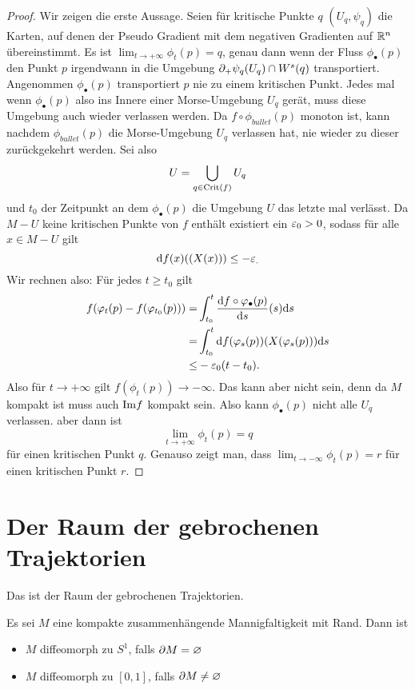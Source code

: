 \begin{proof}
    Wir zeigen die erste Aussage. Seien für kritische Punkte $q$ $(U_q, \psi_q)$ die Karten, 
    auf denen der Pseudo Gradient mit dem negativen Gradienten auf ${ \mathbb R }^n$ übereinstimmt. 
    Es ist $\lim_{t \to + \infty} \phi_t(p) = q$, genau dann wenn
    der Fluss $\phi_{\bullet}(p)$ den Punkt $p$ irgendwann in die Umgebung 
    ${ \partial }_+\psi_q(U_q) \cap { W^s }(q)$ transportiert. Angenommen $\phi_{\bullet}(p)$ transportiert
    $p$ nie zu einem kritischen Punkt. Jedes mal wenn $\phi_{\bullet}(p)$ also ins Innere einer
    Morse-Umgebung $U_q$ gerät, muss diese Umgebung auch wieder verlassen werden. Da 
    $f \circ \phi_{bullet}(p)$ monoton ist, kann nachdem $\phi_{bullet}(p)$ die Morse-Umgebung $U_q$
    verlassen hat, nie wieder zu dieser zurückgekehrt werden.
    Sei also 
    \[ U = \bigcup_{q \in { \operatorname{Crit} }(f)} U_q \]
    und $t_0$ der Zeitpunkt an dem $\phi_{\bullet} (p)$ die Umgebung $U$ das letzte mal verlässt.
    Da $M - U$ keine kritischen Punkte von $f$ enthält existiert ein $\varepsilon_0 > 0$, sodass für alle 
    $x \in M - U$ gilt 
    \[ { \operatorname{d} } f (x) ((X(x))) \leq - \varepsilon_ . \]
    Wir rechnen also: Für jedes $t \geq t_0$ gilt
    \begin{align*}
        f(\varphi_t(p) - f(\varphi_{t_0}(p))) = & 
            \int_{t_0}^t \derive[f \circ \phi_{\bullet}(p)]{s} (s) \opd s \\
        = & \int_{t_0}^t \opd f (\phi_s(p)) (X(\phi_s(p))) \opd s \\
        \leq & - \eps_0 (t - t_0) . 
    \end{align*}
    Also für $t \to + \infty$ gilt $f(\phi_t(p)) \to - \infty$. Das kann aber nicht sein, denn da 
    $M$ kompakt ist muss auch ${ \operatorname{Im} } f$ kompakt sein. Also kann $\phi_{\bullet}(p)$ nicht alle 
    $U_q$ verlassen. aber dann ist 
    \[ \lim_{t \to + \infty} \phi_t(p) = q \]
    für einen kritischen Punkt $q$.
    Genauso zeigt man, dass $\lim_{t \to - \infty} \phi_t(p) = r$ für einen kritischen Punkt $r$.
\end{proof}

\section{Der Raum der gebrochenen Trajektorien}

Das ist der Raum der gebrochenen Trajektorien.

\begin{theorem}
    Es sei $M$ eine kompakte zusammenhängende Mannigfaltigkeit mit Rand. Dann ist
    \begin{itemize}
        \item $M$ diffeomorph zu $S^1$, falls ${ \partial } M = \varnothing$
        \item $M$ diffeomorph zu $[0, 1]$, falls ${ \partial } M \neq \varnothing$
    \end{itemize}
\end{theorem}


